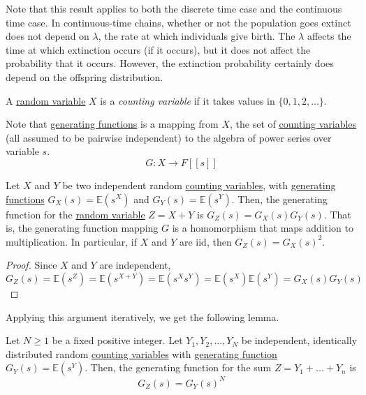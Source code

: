     Note that this result applies to both the discrete time case and the continuous time case. In continuous-time chains, whether or not the population goes extinct does not depend on $\lambda$, the rate at which individuals give birth. The $\lambda$ affects the time at which extinction occurs (if it occurs), but it does not affect the probability that it occurs. However, the extinction probability certainly does depend on the offspring distribution. 

    \begin{definition}
      \label{def:counting-variable}
      A \hyperref[def:random-variable]{random variable} $X$ is a \textit{counting variable} if it takes values in $\{0, 1, 2, ...\}$. 
    \end{definition}

    Note that \hyperref[def:generating-function]{generating functions} is a mapping from $X$, the set of \hyperref[def:counting-variable]{counting variables} (all assumed to be pairwise independent) to the algebra of power series over variable $s$.
    \begin{equation}
      G: X \to F[[s]]
    \end{equation}

    \begin{lemma}
      \label{thm:generating-function-of-a-sum}
      Let $X$ and $Y$ be two independent random \hyperref[def:counting-variable]{counting variables}, with \hyperref[def:generating-function]{generating functions} $G_X (s) = \mathbb{E}(s^X)$ and $G_Y (s) = \mathbb{E}(s^Y)$. Then, the generating function for the \hyperref[def:random-variable]{random variable} $Z = X + Y$ is $G_Z(s) = G_X (s) G_Y (s)$. That is, the generating function mapping $G$ is a homomorphism that maps addition to multiplication. In particular, if $X$ and $Y$ are iid, then $G_Z (s) = G_X (s)^2$. 
    \end{lemma}
    \begin{proof}
      Since $X$ and $Y$ are independent, 
      \begin{equation}
        G_Z (s) = \mathbb{E}(s^Z) = \mathbb{E}(s^{X+Y}) = \mathbb{E}(s^X s^Y) = \mathbb{E}(s^X) \mathbb{E}(s^Y) = G_X (s) G_Y (s)
      \end{equation}
    \end{proof}

    Applying this argument iteratively, we get the following lemma. 
    \begin{lemma}
      \label{thm:generating-function-of-a-fixed-length-random-sum}
      Let $N \geq 1$ be a fixed positive integer. Let $Y_1, Y_2, ..., Y_N$ be independent, identically distributed random \hyperref[def:counting-variable]{counting variables} with \hyperref[def:generating-function]{generating function} $G_Y (s) = \mathbb{E}(s^Y)$. Then, the generating function for the sum $Z = Y_1 + ... + Y_n$ is 
      \begin{equation}
        G_Z (s) = G_Y (s)^N
      \end{equation}
    \end{lemma}

